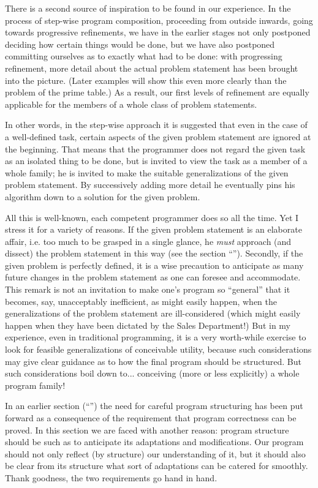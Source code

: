 \documentclass[twoside,11pt]{book}
\begin{document}
There is a second source of inspiration to be found in our experience. In the process of step-wise program composition, proceeding from outside inwards, going towards progressive refinements, we have in the earlier stages not only postponed deciding how certain things would be done, but we have also postponed committing ourselves as to exactly what had to be done: with progressing refinement, more detail about the actual problem statement has been brought into the picture. (Later examples will show this even more clearly than the problem of the prime table.) As a result, our first levels of refinement are equally applicable for the members of a whole class of problem statements.

In other words, in the step-wise approach it is suggested that even in the case of a well-defined task, certain aspects of the given problem statement are ignored at the beginning. That means that the programmer does not regard the given task as an isolated thing to be done, but is invited to view the task as a member of a whole family; he is invited to make the suitable generalizations of the given problem statement. By successively adding more detail he eventually pins his algorithm down to a solution for the given problem.

All this is well-known, each competent programmer does so all the time. Yet I stress it for a variety of reasons. If the given problem statement is an elaborate affair, i.e. too much to be grasped in a single glance, he \textit{must} approach (and dissect) the problem statement in this way (see the section ``''). Secondly, if the given problem is perfectly defined, it is a wise precaution to anticipate as many future changes in the problem statement as one can foresee and accommodate. This remark is not an invitation to make one's program so ``general'' that it becomes, say, unacceptably inefficient, as might easily happen, when the generalizations of the problem statement are ill-considered (which might easily happen when they have been dictated by the Sales Department!) But in my experience, even in traditional programming, it is a very worth-while exercise to look for feasible generalizations of conceivable utility, because such considerations may give clear guidance as to how the final program should be structured. But such considerations boil down to... conceiving (more or less explicitly) a whole program family!

In an earlier section (``'') the need for careful program structuring has been put forward as a consequence of the requirement that program correctness can be proved. In this section we are faced with another reason: program structure should be such as to anticipate its adaptations and modifications. Our program should not only reflect (by structure) our understanding of it, but it should also be clear from its structure what sort of adaptations can be catered for smoothly. Thank goodness, the two requirements go hand in hand.
\end{document}
